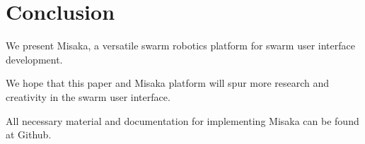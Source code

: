 \documentclass[sigconf]{acmart}
\begin{document}
\section{Conclusion}

We present Misaka, a versatile swarm robotics platform for swarm user interface development.

We hope that this paper and Misaka platform will spur more research and creativity in the swarm user interface.

All necessary material and documentation for implementing Misaka can be found at Github.





\end{document}
